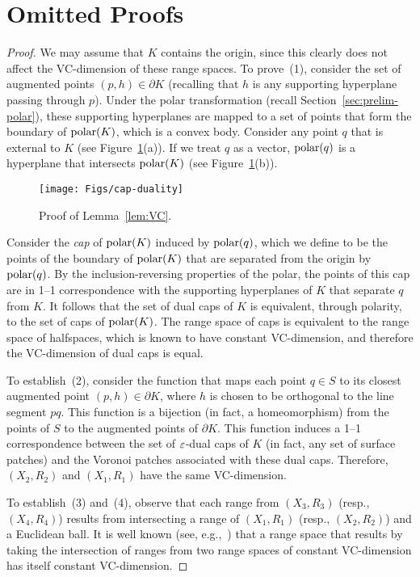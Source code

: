 \documentclass[11pt]{article}   \usepackage[letterpaper,hmargin=2.1cm,vmargin=3cm]{geometry}
\begin{document}
\appendix

\section{Omitted Proofs}


{\VCLemmaStmt*}


\begin{proof}
We may assume that $K$ contains the origin, since this clearly does not affect the VC-dimension of these range spaces. To prove~(1), consider the set of augmented points $(p,h) \in \partial K$ (recalling that $h$ is any supporting hyperplane passing through $p$). Under the polar transformation (recall Section~\ref{sec:prelim-polar}), these supporting hyperplanes are mapped to a set of points that form the boundary of $\mathrm{polar}(K)$, which is a convex body. Consider any point $q$ that is external to $K$ (see Figure~\ref{fig:cap-duality}(a)). If we treat $q$ as a vector, $\mathrm{polar}(q)$ is a hyperplane that intersects $\mathrm{polar}(K)$ (see Figure~\ref{fig:cap-duality}(b)). 

\begin{figure}[htbp]
  \centerline{\texttt{[image: Figs/cap-duality]}}
  \caption{Proof of Lemma~\ref{lem:VC}.}
  \label{fig:cap-duality}
\end{figure}


Consider the \emph{cap} of $\mathrm{polar}(K)$ induced by $\mathrm{polar}(q)$, which we define to be the points of the boundary of $\mathrm{polar}(K)$ that are separated from the origin by $\mathrm{polar}(q)$. By the inclusion-reversing properties of the polar, the points of this cap are in 1--1 correspondence with the supporting hyperplanes of $K$ that separate $q$ from $K$. It follows that the set of dual caps of $K$ is equivalent, through polarity, to the set of caps of $\mathrm{polar}(K)$. The range space of caps is equivalent to the range space of halfspaces, which is known to have constant VC-dimension, and therefore the VC-dimension of dual caps is equal.

To establish~(2), consider the function that maps each point $q \in S$ to its closest augmented point $(p,h) \in \partial K$, where $h$ is chosen to be orthogonal to the line segment $pq$. This function is a bijection (in fact, a homeomorphism) from the points of $S$ to the augmented points of $\partial K$. This function induces a 1--1 correspondence between the set of $\varepsilon$-dual caps of $K$ (in fact, any set of surface patches) and the Voronoi patches associated with these dual caps. Therefore, $(X_2,R_2)$ and $(X_1,R_1)$ have the same VC-dimension.
 
To establish~(3) and~(4), observe that each range from $(X_3,R_3)$ (resp., $(X_4,R_4)$) results from intersecting a range of $(X_1,R_1)$ (resp., $(X_2,R_2)$) and a Euclidean ball. It is well known (see, e.g.,~\cite{Mat02}) that a range space that results by taking the intersection of ranges from two range spaces of constant VC-dimension has itself constant VC-dimension.
\end{proof}
\end{document}
